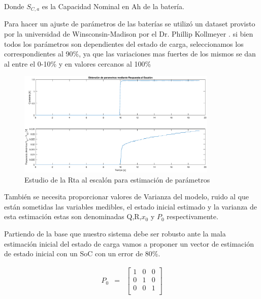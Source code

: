 \documentclass[10pt,a4paper]{article}
\begin{document}
    Donde $S_{C,a}$ es la Capacidad Nominal en Ah de la batería. 

	Para hacer un ajuste de parámetros de las baterías se utilizó un dataset provisto por la universidad de Winsconsin-Madison por el Dr. Phillip Kollmeyer \cite{Kollmeyer2018}. si bien todos los parámetros son dependientes del estado de carga, seleccionamos los correspondientes al 90\%, ya que las variaciones mas fuertes de los mismos se dan al entre el 0-10\% y en valores cercanos al 100\%
	
	\begin{figure}[h!]
		\begin{center}
			\includegraphics[width=0.85\textwidth]{rta_escalon.eps}
			\caption{Estudio de la Rta al escalón para estimación de parámetros}
			\label{rta_escalon}
		\end{center}
	\end{figure}
    \FloatBarrier

	También se necesita proporcionar valores de Varianza del modelo, ruido al que están sometidas las variables medibles, el estado inicial estimado y la varianza de esta estimación estas son denominadas Q,R,$x_0$ y $P_0$ respectivamente.
	
	\noindent Partiendo de la base que nuestro sistema debe ser robusto ante la 
    mala estimación inicial del estado de carga vamos a proponer un vector de 
    estimación de estado inicial con un SoC con un error de 80\%.
	
	\begin{equation}
		\begin{array}{llll}
			P_0 & = & \begin{bmatrix}
				1 & 0 & 0 \\
				0 & 1 & 0 \\
				0 & 0 & 1 \\
			\end{bmatrix} 
		\end{array} \nonumber
	\end{equation}
\end{document}
